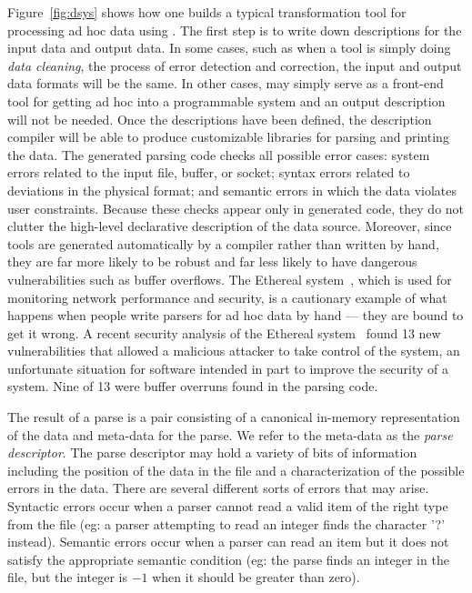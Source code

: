 \documentclass[11pt]{article}
\begin{document}
Figure~\ref{fig:dsys} shows how one builds a typical transformation
tool for processing ad hoc data using \datatype{}.  The first step is
to write down \datatype{} descriptions for the input data and output
data.  In some cases, such as when a tool is simply doing {\em data
cleaning}, the process of error detection and correction, the input
and output data formats will be the same.  In other cases, \datatype{}
may simply serve as a front-end tool for getting ad hoc into a
programmable system and an output description will not be needed.
Once the descriptions have been defined, the \datatype{} description
compiler will be able to produce customizable libraries for parsing
and printing the data.  The generated parsing code checks all possible
error cases: system errors related to the input file, buffer, or
socket; syntax errors related to deviations in the physical format;
and semantic errors in which the data violates user constraints.
Because these checks appear only in generated code, they do not
clutter the high-level declarative description of the data source.
Moreover, since tools are generated automatically by a compiler rather
than written by hand, they are far more likely to be robust and far
less likely to have dangerous vulnerabilities such as buffer
overflows.  The Ethereal system~\cite{ethereal}, which is used for
monitoring network performance and security, is a cautionary example
of what happens when people write parsers for ad hoc data by hand ---
they are bound to get it wrong.  A recent security analysis of the
Ethereal system~\cite{ethereal-attack} found 13 new vulnerabilities
that allowed a malicious attacker to take control of the system, an
unfortunate situation for software intended in part to improve the
security of a system. Nine of 13 were buffer overruns found in the
parsing code.


The result of a parse is a pair consisting of a canonical
in-memory representation of the data and meta-data for the parse.  We
refer to the meta-data as the {\em parse descriptor}. The parse
descriptor may hold a variety of bits of information including
the position of the data in the file and a characterization
of the possible errors in the data.  There are several
different sorts of errors that may arise.  Syntactic errors occur
when a parser cannot read a valid item of the right type from the file 
(eg: a parser attempting to read an integer finds the character '?'
instead).  Semantic errors occur when a parser can read an item
but it does not satisfy the appropriate semantic condition (eg: the
parse finds an integer in the file, but the integer is $-1$ when it
should be greater than zero).  
\end{document}
